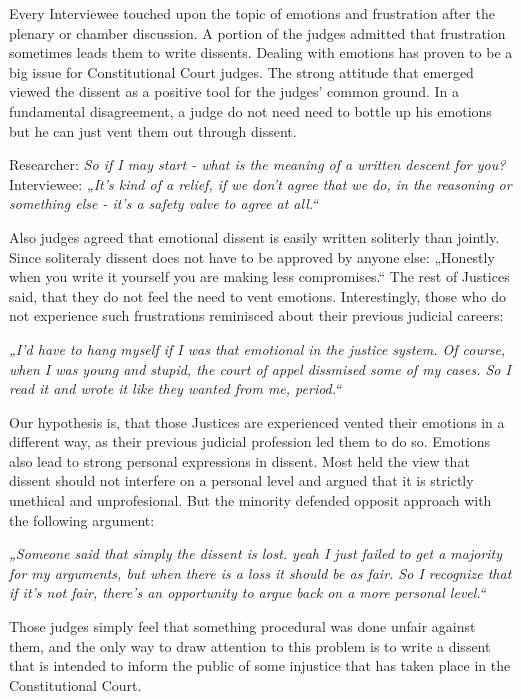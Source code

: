 \documentclass[
  11pt,
]{article}
\begin{document}
Every Interviewee touched upon the topic of emotions and frustration
after the plenary or chamber discussion. A portion of the judges
admitted that frustration sometimes leads them to write dissents.
Dealing with emotions has proven to be a big issue for Constitutional
Court judges. The strong attitude that emerged viewed the dissent as a
positive tool for the judges' common ground. In a fundamental
disagreement, a judge do not need need to bottle up his emotions but he
can just vent them out through dissent.

Researcher: \emph{So if I may start - what is the meaning of a written
descent for you?} Interviewee: \emph{„It's kind of a relief, if we don't
agree that we do, in the reasoning or something else - it's a safety
valve to agree at all.``}

Also judges agreed that emotional dissent is easily written soliterly
than jointly. Since soliteraly dissent does not have to be approved by
anyone else: „Honestly when you write it yourself you are making less
compromises.`` The rest of Justices said, that they do not feel the need
to vent emotions. Interestingly, those who do not experience such
frustrations reminisced about their previous judicial careers:

\emph{„I'd have to hang myself if I was that emotional in the justice
system. Of course, when I was young and stupid, the court of appel
dissmised some of my cases. So I read it and wrote it like they wanted
from me, period.``}

Our hypothesis is, that those Justices are experienced vented their
emotions in a different way, as their previous judicial profession led
them to do so. Emotions also lead to strong personal expressions in
dissent. Most held the view that dissent should not interfere on a
personal level and argued that it is strictly unethical and
unprofesional. But the minority defended opposit approach with the
following argument:

\emph{„Someone said that simply the dissent is lost. yeah I just failed
to get a majority for my arguments, but when there is a loss it should
be as fair. So I recognize that if it's not fair, there's an opportunity
to argue back on a more personal level.``}

Those judges simply feel that something procedural was done unfair
against them, and the only way to draw attention to this problem is to
write a dissent that is intended to inform the public of some injustice
that has taken place in the Constitutional Court.
\end{document}
